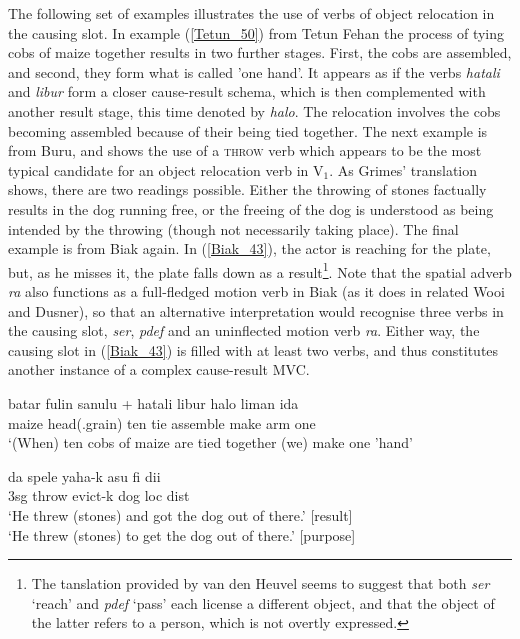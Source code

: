 The following set of examples illustrates the use of verbs of object relocation in the causing slot. In example (\ref{Tetun_50}) from Tetun Fehan the process of tying cobs of maize together results in two further stages. First, the cobs are assembled, and second, they form what is called 'one hand'. It appears as if the verbs \textit{hatali} and \textit{libur} form a closer cause-result schema, which is then complemented with another result stage, this time denoted by \textit{halo}. The relocation involves the cobs becoming assembled because of their being tied together. The next example is from Buru, and shows the use of a \textsc{throw} verb which appears to be the most typical candidate for an object relocation verb in V$_1$. As Grimes' translation shows, there are two readings possible. Either the throwing of stones factually results in the dog running free, or the freeing of the dog is understood as being intended by the throwing (though not necessarily taking place). The final example is from Biak again. In (\ref{Biak_43}), the actor is reaching for the plate, but, as he misses it, the plate falls down as a result\footnote{The tanslation provided by van den Heuvel seems to suggest that both \textit{ser} `reach' and \textit{pdef} `pass' each license a different object, and that the object of the latter refers to a person, which is not overtly expressed.}. Note that the spatial adverb \textit{ra} also functions as a full-fledged motion verb in Biak (as it does in related Wooi and Dusner), so that an alternative interpretation would recognise three verbs in the causing slot, \textit{ser}, \textit{pdef} and an uninflected motion verb \textit{ra}. Either way, the causing slot in (\ref{Biak_43}) is filled with at least two verbs, and thus constitutes another instance of a complex cause-result MVC.

\ea \label{Tetun_50}
\gll batar fulin sanulu + hatali libur halo liman ida \\
maize head(.grain) ten tie assemble make arm one \\
\glft `(When) ten cobs of maize are tied together (we) make one 'hand' \\ 
\z
\xe

\ea \label{Buru_21}
\gll da spele yaha-k asu fi dii \\
3\acs{sg} throw evict-k dog \acs{loc} \acs{dist} \\
\glft `He threw (stones) and got the dog out of there.' [result] \\
`He threw (stones) to get the dog out of there.' [purpose] \\ 
\z
\xe

